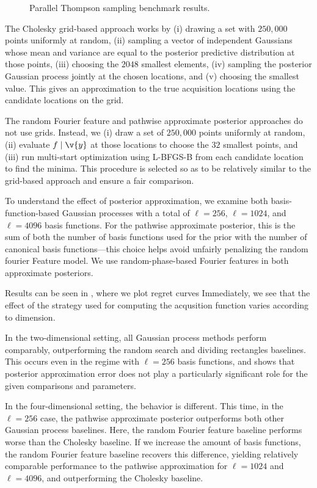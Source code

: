 \documentclass[11pt]{book}
\begin{document}
\begin{figure*}[p!]

\caption{Parallel Thompson sampling benchmark results.}
\label{fig:parallel-ts}
\end{figure*}

The Cholesky grid-based approach works by (i) drawing a set with $250,000$ points uniformly at random, (ii) sampling a vector of independent Gaussians whose mean and variance are equal to the posterior predictive distribution at those points, (iii) choosing the $2048$ smallest elements, (iv) sampling the posterior Gaussian process jointly at the chosen locations, and (v) choosing the smallest value.
This gives an approximation to the true acquisition locations using the candidate locations on the grid.

The random Fourier feature and pathwise approximate posterior approaches do not use grids.
Instead, we (i) draw a set of $250,000$ points uniformly at random, (ii) evaluate $f \given \v{y}$ at those locations to choose the $32$ smallest points, and (iii) run multi-start optimization using L-BFGS-B \cite{byrd95} from each candidate location to find the minima.
This procedure is selected so as to be relatively similar to the grid-based approach and ensure a fair comparison.


To understand the effect of posterior approximation, we examine both basis-function-based Gaussian processes with a total of $\ell = 256$, $\ell = 1024$, and $\ell = 4096$ basis functions.
For the pathwise approximate posterior, this is the sum of both the number of basis functions used for the prior with the number of canonical basis functions---this choice helps avoid unfairly penalizing the random fourier Feature model.
We use random-phase-based Fourier features in both approximate posteriors.

Results can be seen in , where we plot regret curves 
Immediately, we see that the effect of the strategy used for computing the acqusition function varies according to dimension.

In the two-dimensional setting, all Gaussian process methods perform comparably, outperforming the random search and dividing rectangles baselines.
This occurs even in the regime with $\ell = 256$ basis functions, and shows that posterior approximation error does not play a particularly significant role for the given comparisons and parameters.

In the four-dimensional setting, the behavior is different.
This time, in the $\ell = 256$ case, the pathwise approximate posterior outperforms both other Gaussian process baselines.
Here, the random Fourier feature baseline performs worse than the Cholesky baseline.
If we increase the amount of basis functions, the random Fourier feature baseline recovers this difference, yielding relatively comparable performance to the pathwise approximation for $\ell = 1024$ and $\ell = 4096$, and outperforming the Cholesky baseline.
\end{document}
